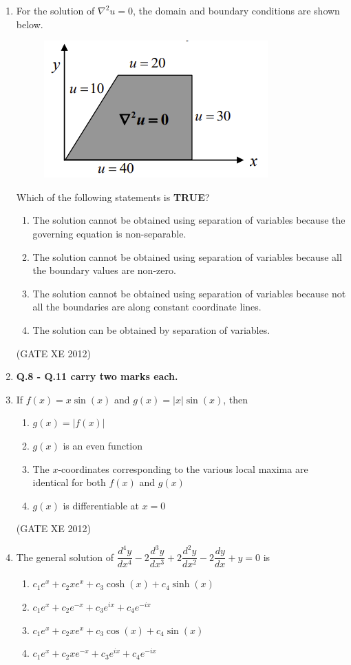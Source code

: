 \documentclass[12pt]{article}
\begin{document}
\begin{enumerate}
\item For the solution of $\nabla^{2}u = 0$, the domain and boundary conditions are shown below.

\begin{figure}[H]
    \centering
    \includegraphics[width=0.5\columnwidth]{figs/ass2_a_q7.png}
    \caption{}
    \label{fig:placeholder}
\end{figure}
Which of the following statements is \textbf{TRUE}?
\begin{enumerate}
\item The solution cannot be obtained using separation of variables because the governing equation is non-separable.
\item The solution cannot be obtained using separation of variables because all the boundary values are non-zero.
\item The solution cannot be obtained using separation of variables because not all the boundaries are along constant coordinate lines.
\item The solution can be obtained by separation of variables.
\end{enumerate}

(GATE XE 2012)

\item[] \textbf{Q.8 - Q.11 carry two marks each.}

\item If $f(x) = x\sin(x)$ and $g(x) = |x|\sin(x)$, then
\begin{enumerate}
\item $g(x) = |f(x)|$
\item $g(x)$ is an even function
\item The $x$-coordinates corresponding to the various local maxima are identical for both $f(x)$ and $g(x)$
\item $g(x)$ is differentiable at $x=0$
\end{enumerate}

(GATE XE 2012)

\item The general solution of $\dfrac{d^{4}y}{dx^{4}} - 2\dfrac{d^{3}y}{dx^{3}} + 2\dfrac{d^{2}y}{dx^{2}} - 2\dfrac{dy}{dx} + y = 0$ is
\begin{enumerate}
\item $c_{1}e^{x} + c_{2}xe^{x} + c_{3}\cosh(x) + c_{4}\sinh(x)$
\item $c_{1}e^{x} + c_{2}e^{-x} + c_{3}e^{ix} + c_{4}e^{-ix}$
\item $c_{1}e^{x} + c_{2}xe^{x} + c_{3}\cos(x) + c_{4}\sin(x)$
\item $c_{1}e^{x} + c_{2}xe^{-x} + c_{3}e^{ix} + c_{4}e^{-ix}$
\end{enumerate}


\end{enumerate}
\end{document}
